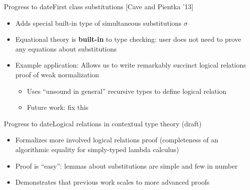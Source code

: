 \documentclass[usenames,dvipsnames]{beamer}
\begin{document}
\begin{frame}{Progress to date}{First class substitutions [Cave and Pientka '13]}
\begin{itemize}
\item Adds special built-in type of simultaneous substitutions $\sigma$
\item Equational theory is \textbf{built-in} to type checking: user does not need to prove any equations about substitutions
\item Example application: Allows us to write remarkably succinct logical relations proof of weak normalization
\begin{itemize}
\item Uses ``unsound in general'' recursive types to define logical relation
\item Future work: fix this
\end{itemize}
\end{itemize}
\end{frame}

\begin{frame}{Progress to date}{Logical relations in contextual type theory (draft)}
\begin{itemize}
\item Formalizes more involved logical relations proof (completeness of an algorithmic equality for simply-typed lambda calculus)
\item Proof is ``easy'': lemmas about substitutions are simple and few in number
\item Demonstrates that previous work scales to more advanced proofs
\end{itemize}
\end{frame}
\end{document}
